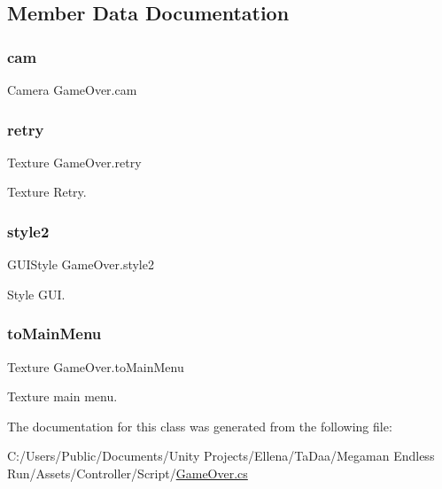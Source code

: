 \subsection{Member Data Documentation}
\hypertarget{class_game_over_a899a798fa536c25b7c9781ee8c3ab9fd}{}\label{class_game_over_a899a798fa536c25b7c9781ee8c3ab9fd} 
\subsubsection{\texorpdfstring{cam}{cam}}
{\footnotesize\ttfamily Camera Game\+Over.\+cam}

\hypertarget{class_game_over_ace41c3a08ba092a634f4b4b92c358e12}{}\label{class_game_over_ace41c3a08ba092a634f4b4b92c358e12} 
\subsubsection{\texorpdfstring{retry}{retry}}
{\footnotesize\ttfamily Texture Game\+Over.\+retry}



Texture Retry. 

\hypertarget{class_game_over_a71e12fb4df1725763589943e10d7d9ec}{}\label{class_game_over_a71e12fb4df1725763589943e10d7d9ec} 
\subsubsection{\texorpdfstring{style2}{style2}}
{\footnotesize\ttfamily G\+U\+I\+Style Game\+Over.\+style2}



Style G\+UI. 

\hypertarget{class_game_over_aeffb99ea771f8eb04e5fe5c4c7dc71b2}{}\label{class_game_over_aeffb99ea771f8eb04e5fe5c4c7dc71b2} 
\subsubsection{\texorpdfstring{to\+Main\+Menu}{toMainMenu}}
{\footnotesize\ttfamily Texture Game\+Over.\+to\+Main\+Menu}



Texture main menu. 



The documentation for this class was generated from the following file\+:\begin{DoxyCompactItemize}
\item 
C\+:/\+Users/\+Public/\+Documents/\+Unity Projects/\+Ellena/\+Ta\+Daa/\+Megaman Endless Run/\+Assets/\+Controller/\+Script/\hyperlink{_game_over_8cs}{Game\+Over.\+cs}\end{DoxyCompactItemize}
